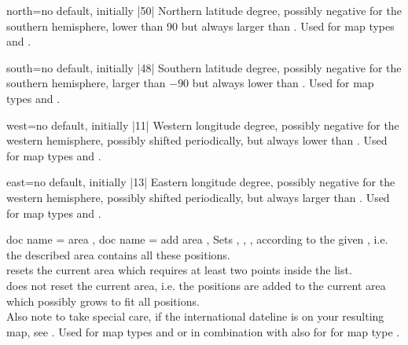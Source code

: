 \begin{docMrcKey}[supply]{north}{=}{no default, initially |50|}
  Northern latitude degree, possibly negative for the southern hemisphere,
  lower than $90$ but always larger than .
  Used for map types  and .
\end{docMrcKey}

\begin{docMrcKey}[supply]{south}{=}{no default, initially |48|}
  Southern latitude degree, possibly negative for the southern hemisphere,
  larger than $-90$ but always lower than .
  Used for map types  and .
\end{docMrcKey}

\begin{docMrcKey}[supply]{west}{=}{no default, initially |11|}
  Western longitude degree, possibly negative for the western hemisphere,
  possibly shifted periodically, but always lower than .
  Used for map types  and .
\end{docMrcKey}

\begin{docMrcKey}[supply]{east}{=}{no default, initially |13|}
  Eastern longitude degree, possibly negative for the western hemisphere,
  possibly shifted periodically, but always larger than .
  Used for map types  and .
\end{docMrcKey}


\begin{docMrcKeys}[
  doc keypath     = supply,
  doc parameter   = {=\marg{comma separated list of named positions}},
  doc description = {no default},
]{
  { doc name = area },
  { doc name = add area },
}
  Sets
  , ,
  , 
  according to the given , i.e.
  the described area contains all these positions.\\
   resets the current area which requires
  at least two points inside the list.\\
   does not reset the current area,
  i.e. the positions are added to the
  current area which possibly grows to fit all positions.\\
  Also note to take special care, if the international dateline is on your
  resulting map, see .
  Used for map types  and 
  or in combination with  also
  for for map type .
\end{docMrcKeys}



